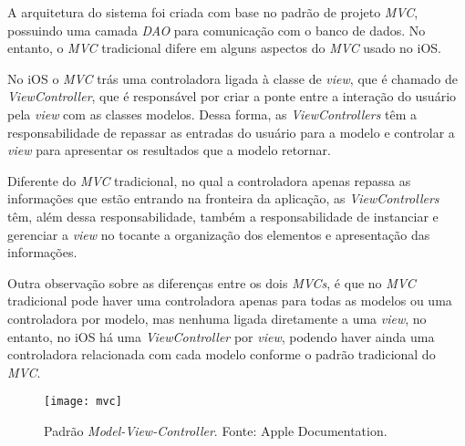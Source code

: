A arquitetura do sistema foi criada com base no padrão de projeto \textit{MVC}, possuindo uma camada \textit{DAO} para comunicação 
com o banco de dados. No entanto, o \textit{MVC} tradicional difere em alguns aspectos do \textit{MVC} usado no iOS. 

No iOS o \textit{MVC} trás uma controladora ligada à classe de \textit{view}, que é chamado de \textit{ViewController}, que é responsável por 
criar a ponte entre a interação do usuário pela \textit{view} com as classes modelos. Dessa forma, as \textit{ViewControllers} têm a 
responsabilidade de repassar as entradas do usuário para a modelo e controlar a \textit{view} para apresentar os resultados que a modelo retornar.

Diferente do \textit{MVC} tradicional, no qual a controladora apenas repassa as informações que estão entrando na fronteira da aplicação, 
as \textit{ViewControllers} têm, além dessa responsabilidade, também a responsabilidade de instanciar e gerenciar a \textit{view} no tocante
a organização dos elementos e apresentação das informações.

Outra observação sobre as diferenças entre os dois \textit{MVCs}, é que no \textit{MVC} tradicional pode haver uma controladora apenas 
para todas as modelos ou uma controladora por modelo, mas nenhuma ligada diretamente a uma \textit{view}, no entanto, no iOS há uma 
\textit{ViewController} por \textit{view}, podendo haver ainda uma controladora relacionada com cada modelo conforme o padrão tradicional do \textit{MVC}.

\begin{figure}[h]
  \centering
    \texttt{[image: mvc]}
    \caption[Padrão \textit{Model-View-Controller}]{ Padrão \textit{Model-View-Controller}. Fonte: Apple Documentation.}
	\label{fig:mvc}
\end{figure}

